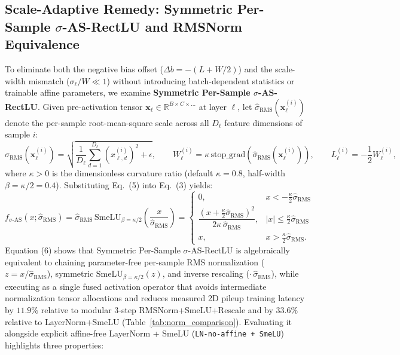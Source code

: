 \documentclass[11pt, a4paper]{article}
\begin{document}
\subsection{Scale-Adaptive Remedy: Symmetric Per-Sample $\sigma$-AS-RectLU and RMSNorm Equivalence}
To eliminate both the negative bias offset ($\Delta b = -(L+W/2)$) and the scale-width mismatch ($\sigma_{\ell}/W \ll 1$) without introducing batch-dependent statistics or trainable affine parameters, we examine \textbf{Symmetric Per-Sample $\sigma$-AS-RectLU}. Given pre-activation tensor $\mathbf{x}_{\ell} \in \mathbb{R}^{B \times C \times \dots}$ at layer $\ell$, let $\hat{\sigma}_{\text{RMS}}(\mathbf{x}_{\ell}^{(i)})$ denote the per-sample root-mean-square scale across all $D_{\ell}$ feature dimensions of sample $i$:
\begin{equation}
\hat{\sigma}_{\text{RMS}}\!\left(\mathbf{x}_{\ell}^{(i)}\right) = \sqrt{\frac{1}{D_{\ell}}\sum_{d=1}^{D_{\ell}}\left(x_{\ell, d}^{(i)}\right)^{2} + \epsilon}, \qquad W_{\ell}^{(i)} = \kappa\,\text{stop\_grad}\!\left(\hat{\sigma}_{\text{RMS}}\!\left(\mathbf{x}_{\ell}^{(i)}\right)\right), \qquad L_{\ell}^{(i)} = -\frac{1}{2}W_{\ell}^{(i)},
\end{equation}
where $\kappa > 0$ is the dimensionless curvature ratio (default $\kappa = 0.8$, half-width $\beta = \kappa/2 = 0.4$). Substituting Eq.\ (5) into Eq.\ (3) yields:
\begin{equation}
f_{\sigma\text{-AS}}\!\left(x; \hat{\sigma}_{\text{RMS}}\right) = \hat{\sigma}_{\text{RMS}}\,\text{SmeLU}_{\beta = \kappa/2}\!\left(\frac{x}{\hat{\sigma}_{\text{RMS}}}\right) = \begin{cases} 0, & x < -\frac{\kappa}{2}\hat{\sigma}_{\text{RMS}} \\ \dfrac{\left(x + \frac{\kappa}{2}\hat{\sigma}_{\text{RMS}}\right)^{2}}{2\kappa\,\hat{\sigma}_{\text{RMS}}}, & \left|x\right| \le \frac{\kappa}{2}\hat{\sigma}_{\text{RMS}} \\ x, & x > \frac{\kappa}{2}\hat{\sigma}_{\text{RMS}}. \end{cases}
\end{equation}
Equation (6) shows that Symmetric Per-Sample $\sigma$-AS-RectLU is algebraically equivalent to chaining parameter-free per-sample RMS normalization ($z = x/\hat{\sigma}_{\text{RMS}}$), symmetric $\text{SmeLU}_{\beta=\kappa/2}(z)$, and inverse rescaling ($\cdot\,\hat{\sigma}_{\text{RMS}}$), while executing as a single fused activation operator that avoids intermediate normalization tensor allocations and reduces measured 2D pileup training latency by $11.9\%$ relative to modular 3-step RMSNorm+SmeLU+Rescale and by $33.6\%$ relative to LayerNorm+SmeLU (Table~\ref{tab:norm_comparison}). Evaluating it alongside explicit affine-free LayerNorm + SmeLU (\texttt{LN-no-affine + SmeLU}) highlights three properties:
\end{document}
